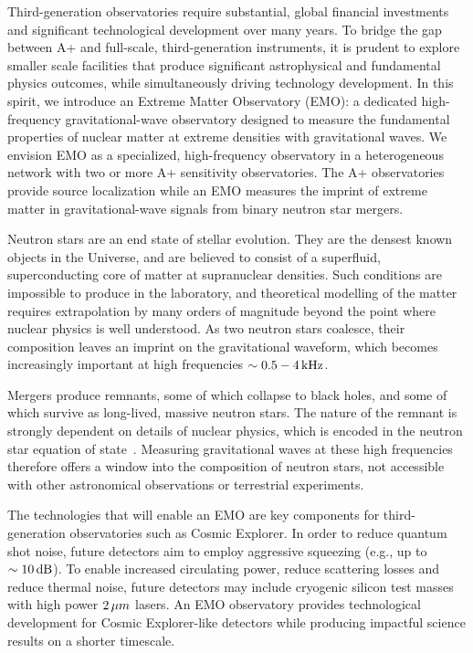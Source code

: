 \documentclass[prx,superscriptaddress,twocolumn,nopreprintnumbers,floatfix,nofootinbib]{revtex4}
\begin{document}
Third-generation observatories require substantial, global financial investments and significant technological development over many years.
To bridge the gap between A+ and full-scale, third-generation instruments, it is prudent to explore smaller scale facilities that produce significant astrophysical and fundamental physics outcomes, while simultaneously driving technology development.
In this spirit, we introduce an Extreme Matter Observatory (EMO): a dedicated high-frequency gravitational-wave observatory designed to measure the fundamental properties of nuclear matter at extreme densities with gravitational waves.
We envision EMO as a specialized, high-frequency observatory in a heterogeneous network with two or more A+ sensitivity observatories.
The A+ observatories provide source localization while an EMO measures the imprint of extreme matter in gravitational-wave signals from binary neutron star mergers.

Neutron stars are an end state of stellar evolution.
They are the densest known objects in the Universe, and are believed to consist of a superfluid, superconducting core of matter at supranuclear densities.
Such conditions are impossible to produce in the laboratory, and theoretical modelling of the matter requires extrapolation by many orders of magnitude beyond the point where nuclear physics is well understood.
As two neutron stars coalesce, their composition leaves an imprint on the gravitational waveform, which becomes increasingly important at high frequencies $\sim\unit[0.5-4]{kHz}$.

Mergers produce remnants, some of which collapse to black holes, and some of which survive as long-lived, massive neutron stars.
The nature of the remnant is strongly dependent on details of nuclear physics, which is encoded in the neutron star equation of state~\cite[e.g., see][and references therein]{bernuzzi19}.  
Measuring gravitational waves at these high frequencies therefore offers a window into the composition of neutron stars, not accessible with other astronomical observations or terrestrial experiments.  

The technologies that will enable an EMO are key components for third-generation observatories such as Cosmic Explorer. 
In order to reduce quantum shot noise, future detectors aim to employ aggressive squeezing (e.g., up to $\sim\unit[10]{dB}$).  
To enable increased circulating power, reduce scattering losses and reduce thermal noise, future detectors may include cryogenic silicon test masses with high power $\unit[2]{\mu} m$ lasers.
An EMO observatory provides technological development for Cosmic Explorer-like detectors while producing impactful science results on a shorter timescale.
\end{document}
